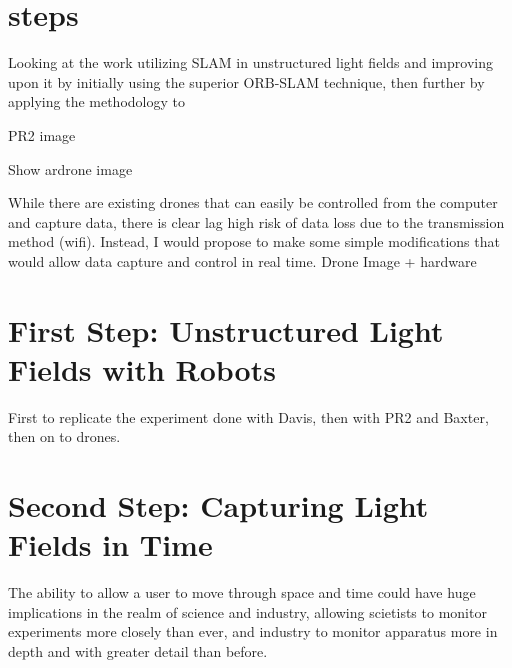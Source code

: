 \documentclass[12pt]{report}
\begin{document}
\section*{steps}
Looking at the work utilizing SLAM in unstructured light fields and improving upon it by initially using the superior ORB-SLAM technique, then further by applying the methodology to 

PR2 image

Show ardrone image

While there are existing drones that can easily be controlled from the computer and capture data, there is clear lag high risk of data loss due to the transmission method (wifi). Instead, I would propose to make some simple modifications that would allow data capture and control in real time.
Drone Image + hardware

\section*{First Step: Unstructured Light Fields with Robots}
First to replicate the experiment done with Davis, then with PR2 and Baxter, then on to drones.

\section*{Second Step: Capturing Light Fields in Time}
The ability to allow a user to move through space and time could have huge implications in the realm of science and industry, allowing scietists to monitor experiments more closely than ever, and industry to monitor apparatus more in depth and with greater detail than before.
\end{document}
